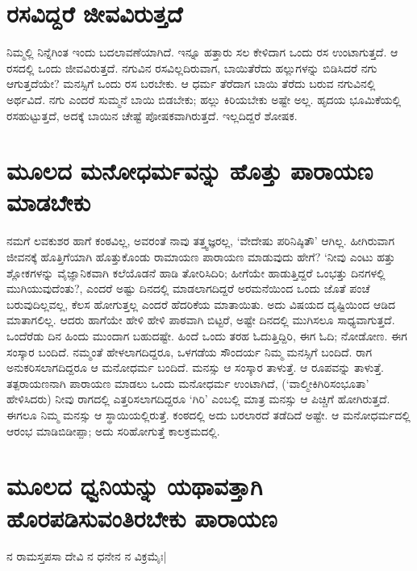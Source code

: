 \section*{ರಸವಿದ್ದರೆ ಜೀವವಿರುತ್ತದೆ} 

ನಿಮ್ಮಲ್ಲಿ ನಿನ್ನೆಗಿಂತ ಇಂದು ಬದಲಾವಣೆಯಾಗಿದೆ. ಇನ್ನೂ ಹತ್ತಾರು ಸಲ ಕೇಳಿದಾಗ ಒಂದು ರಸ ಉಂಟಾಗುತ್ತದೆ. ಆ ರಸದಲ್ಲಿ ಒಂದು ಜೀವವಿರುತ್ತದೆ. ನಗುವಿನ ರಸವಿಲ್ಲದಿರುವಾಗ, ಬಾಯಿತೆರೆದು ಹಲ್ಲುಗಳನ್ನು ಬಿಡಿಸಿದರೆ ನಗು ಆಗುತ್ತದೆಯೇ? ಮನಸ್ಸಿಗೆ ಒಂದು ರಸ ಬರಬೇಕು. ಆ ಧರ್ಮ ತೆರೆದಾಗ ಬಾಯಿ ತೆರೆದು ಬರುವ ನಗುವಿನಲ್ಲಿ ಅರ್ಥವಿದೆ. ನಗು ಎಂದರೆ ಸುಮ್ಮನೆ ಬಾಯಿ ಬಿಡಬೇಕು; ಹಲ್ಲು ಕಿರಿಯಬೇಕು ಅಷ್ಟೇ ಅಲ್ಲ. ಹೃದಯ ಭೂಮಿಕೆಯಲ್ಲಿ ರಸಹುಟ್ಟುತ್ತದೆ, ಅದಕ್ಕೆ ಬಾಯಿನ ಚೇಷ್ಟೆ ಪೋಷಕವಾಗಿರುತ್ತದೆ. ಇಲ್ಲದಿದ್ದರೆ ಶೋಷಕ. 

\section*{ಮೂಲದ ಮನೋಧರ್ಮವನ್ನು ಹೊತ್ತು ಪಾರಾಯಣ ಮಾಡಬೇಕು} 

ನಮಗೆ ಲವಕುಶರ ಹಾಗೆ ಕಂಠವಿಲ್ಲ, ಅವರಂತೆ ನಾವು ತತ್ತ್ವಜ್ಞರಲ್ಲ, `ವೇದೇಷು ಪರಿನಿಷ್ಠಿತೌ' ಆಗಿಲ್ಲ. ಹೀಗಿರುವಾಗ ಜೀವನಕ್ಕೆ ಹೊತ್ತಿಗೆಯಾಗಿ ಹೊತ್ತುಕೊಂಡು ರಾಮಾಯಣ ಪಾರಾಯಣ ಮಾಡುವುದು ಹೇಗೆ? `ನೀವು ಎಂಟು ಹತ್ತು ಶ್ಲೋಕಗಳನ್ನು ವೈಜ್ಞಾನಿಕವಾಗಿ ಕಲೆಯೊಡನೆ ಹಾಡಿ ತೋರಿಸಿದಿರಿ; ಹೀಗೆಯೇ ಹಾಡುತ್ತಿದ್ದರೆ ಒಂಭತ್ತು ದಿನಗಳಲ್ಲಿ ಮುಗಿಯುವುದೆಂತು?, ಎಂದರೆ ಅಷ್ಟು ದಿನದಲ್ಲಿ ಮಾಡಲಾಗದಿದ್ದರೆ ಅರಮನೆಯಿಂದ ಒಂದು ಜೊತೆ ಪಂಚೆ ಬರುವುದಿಲ್ಲವಲ್ಲ, ಕೆಲಸ ಹೋಗುತ್ತಲ್ಲ ಎಂದರೆ ಹೆದರಿಕೆಯ ಮಾತಾಯಿತು. ಅದು ವಿಷಯದ ದೃಷ್ಟಿಯಿಂದ ಆಡಿದ ಮಾತಾಗಲಿಲ್ಲ. ಆದರು ಹಾಗೆಯೇ ಹೇಳಿ ಹೇಳಿ ಪಾಠವಾಗಿ ಬಿಟ್ಟರೆ, ಅಷ್ಟೇ ದಿನದಲ್ಲಿ ಮುಗಿಸಲೂ ಸಾಧ್ಯವಾಗುತ್ತದೆ. ಒಂದೆರೆಡು ದಿನ ಹಿಂದು ಮುಂದಾಗ ಬಹುದಷ್ಟೇ. ಹಿಂದೆ ಒಂದು ತರಹ ಓದುತ್ತಿದ್ದಿರಿ, ಈಗ ಓದಿ; ನೋಡೋಣ. ಈಗ ಸಂಸ್ಕಾರ ಬಂದಿದೆ. ನಮ್ಮಂತೆ ಹೇಳಲಾಗದಿದ್ದರೂ, ಒಳಗಡೆಯ ಸೌಂದರ್ಯ ನಿಮ್ಮ ಮನಸ್ಸಿಗೆ ಬಂದಿದೆ. ರಾಗ ಅನುಕರಿಸಲಾಗದಿದ್ದರೂ ಆ ಮನೋಧರ್ಮ ಬಂದಿದೆ. ಮನಸ್ಸು ಆ ಸಂಸ್ಕಾರ ತಾಳುತ್ತೆ. ಆ ರೂಪವನ್ನು ತಾಳುತ್ತೆ. ತತ್ಪರಾಯಣನಾಗಿ ಪಾರಾಯಣ ಮಾಡಲು ಒಂದು ಮನೋಧರ್ಮ ಉಂಟಾಗಿದೆ, (`ವಾಲ್ಮೀಕಿಗಿರಿಸಂಭೂತಾ' ಹೇಳಿಸಿದರು) ನೀವು ರಾಗದಲ್ಲಿ ಎತ್ತರಿಸಲಾಗದಿದ್ದರೂ `ಗಿರಿ' ಎಂಬಲ್ಲಿ ಮಾತ್ರ ಮನಸ್ಸು ಆ ಪಿಚ್ಚಿಗೆ ಹೋಗಿರುತ್ತದೆ. ಈಗಲೂ ನಿಮ್ಮ ಮನಸ್ಸು ಆ ಸ್ಥಾಯಿಯಲ್ಲಿರುತ್ತೆ. ಕಂಠದಲ್ಲಿ ಅದು ಬರಲಾರದೆ ತಡೆದಿದೆ ಅಷ್ಟೇ. ಆ ಮನೋಧರ್ಮದಲ್ಲಿ ಆರಂಭ ಮಾಡಿಬಿಡೀಪ್ಪಾ; ಅದು ಸರಿಹೋಗುತ್ತೆ ಕಾಲಕ್ರಮದಲ್ಲಿ. 

\section*{ಮೂಲದ ಧ್ವನಿಯನ್ನು ಯಥಾವತ್ತಾಗಿ ಹೊರಪಡಿಸುವಂತಿರಬೇಕು ಪಾರಾಯಣ} 

\begin{shloka} 
ನ ರಾಮಸ್ತಪಸಾ ದೇವಿ ನ ಧನೇನ ನ ವಿಕ್ರಮೈಃ| 
\end{shloka}

